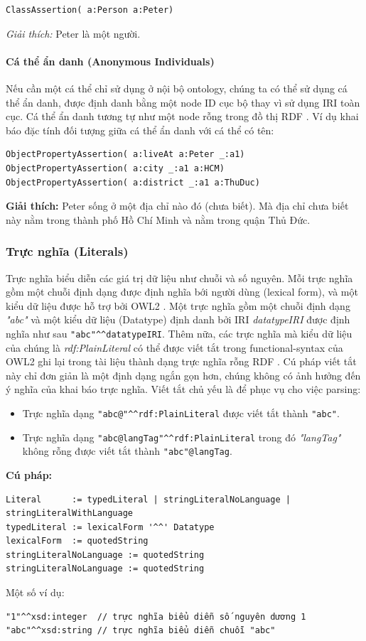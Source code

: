 \begin{verbatim}
ClassAssertion( a:Person a:Peter)
\end{verbatim}

\textit{Giải thích:} Peter là một người.

\paragraph{Cá thể ẩn danh (Anonymous Individuals)} Nếu cần một cá thể chỉ sử dụng ở nội bộ ontology, chúng ta có thể sử dụng cá thể ẩn danh, được định danh bằng một node ID cục bộ thay vì sử dụng IRI toàn cục. Cá thể ẩn danh tương tự như một node rỗng trong đồ thị RDF \cite{rdf_concept}. Ví dụ khai báo đặc tính đối tượng giữa cá thể ẩn danh với cá thể có tên:

\begin{verbatim}
ObjectPropertyAssertion( a:liveAt a:Peter _:a1)
ObjectPropertyAssertion( a:city _:a1 a:HCM)
ObjectPropertyAssertion( a:district _:a1 a:ThuDuc)
\end{verbatim}

\textbf{Giải thích:} Peter sống ở một địa chỉ nào đó (chưa biết). Mà địa chỉ chưa biết này nằm trong thành phố Hồ Chí Minh và nằm trong quận Thủ Đức.

\subsubsection{Trực nghĩa (Literals)}
Trực nghĩa biểu diễn các giá trị dữ liệu như chuỗi và số nguyên. Mỗi trực nghĩa gồm một chuỗi định dạng được định nghĩa bới người dùng (lexical form), và một kiểu dữ liệu được hỗ trợ bởi OWL2 \cite{owl2spec} . Một trực nghĩa gồm một chuỗi định dạng \textit{"abc"} và một kiểu dữ liệu (Datatype) định danh bởi IRI \textit{datatypeIRI} được định nghĩa như sau \verb|"abc"^^datatypeIRI|. Thêm nữa, các trực nghĩa mà kiểu dữ liệu của chúng là \textit{rdf:PlainLiteral} có thể được viết tắt trong functional-syntax của OWL2 ghi lại trong tài liệu thành dạng trực nghĩa rỗng RDF \cite{rdf_concept}. Cú pháp viết tắt này chỉ đơn giản là một định dạng ngắn gọn hơn, chúng không có ảnh hưởng đến ý nghĩa của khai báo trực nghĩa. Viết tắt chủ yếu là để phục vụ cho việc parsing:
\begin{itemize}
\item Trực nghĩa dạng \verb|"abc@"^^rdf:PlainLiteral| được viết tắt thành \verb|"abc"|.
\item Trực nghĩa dạng \verb|"abc@langTag"^^rdf:PlainLiteral| trong đó \textit{"langTag"} không rỗng được viết tắt thành \verb|"abc"@langTag|.
\end{itemize}
\textbf{Cú pháp:}
\begin{verbatim}
Literal      := typedLiteral | stringLiteralNoLanguage | stringLiteralWithLanguage
typedLiteral := lexicalForm '^^' Datatype
lexicalForm  := quotedString
stringLiteralNoLanguage := quotedString
stringLiteralNoLanguage := quotedString
\end{verbatim}
Một số ví dụ:
\begin{verbatim}
"1"^^xsd:integer  // trực nghĩa biểu diễn số nguyên dương 1
"abc"^^xsd:string // trực nghĩa biểu diễn chuỗi "abc"
\end{verbatim}

